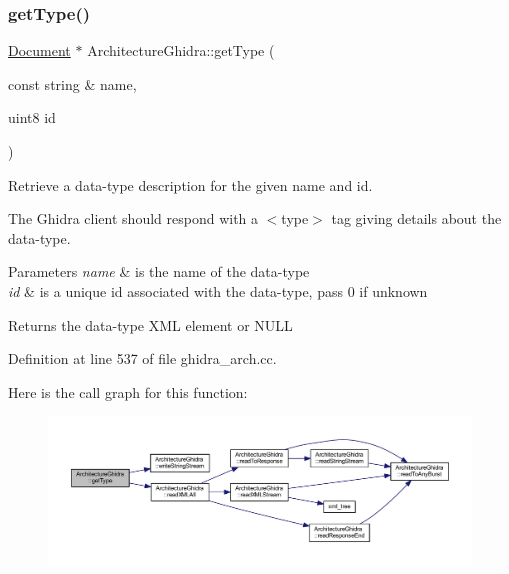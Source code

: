 \subsubsection{\texorpdfstring{getType()}{getType()}}
{\footnotesize\ttfamily \mbox{\hyperlink{class_document}{Document}} $\ast$ Architecture\+Ghidra\+::get\+Type (\begin{DoxyParamCaption}\item[{const string \&}]{name,  }\item[{uint8}]{id }\end{DoxyParamCaption})}



Retrieve a data-\/type description for the given name and id. 

The Ghidra client should respond with a $<$type$>$ tag giving details about the data-\/type. 
\begin{DoxyParams}{Parameters}
{\em name} & is the name of the data-\/type \\
\hline
{\em id} & is a unique id associated with the data-\/type, pass 0 if unknown \\
\hline
\end{DoxyParams}
\begin{DoxyReturn}{Returns}
the data-\/type X\+ML element or N\+U\+LL 
\end{DoxyReturn}


Definition at line 537 of file ghidra\+\_\+arch.\+cc.

Here is the call graph for this function\+:
\nopagebreak
\begin{figure}[H]
\begin{center}
\leavevmode
\includegraphics[width=350pt]{class_architecture_ghidra_ad3176a91f7b9643326d94eaab5613a1c_cgraph}
\end{center}
\end{figure}
\mbox{\label{class_architecture_ghidra_a743c6158bb0075ab7c13d15725d13414}} 
